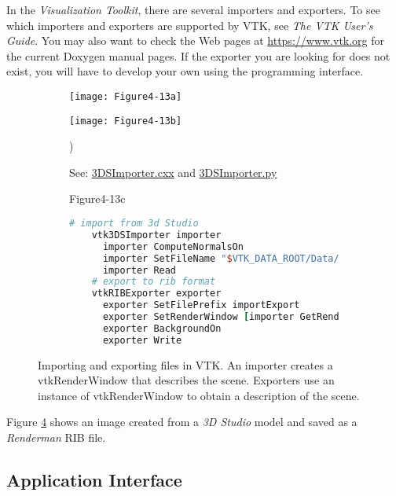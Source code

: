 In the \emph{Visualization Toolkit}, there are several importers and exporters. To see which importers and exporters are supported by VTK, see \emph{The VTK User's Guide}. You may also want to check the Web pages at \href{https://www.vtk.org}{https://www.vtk.org} for the current Doxygen manual pages. If the exporter you are looking for does not exist, you will have to develop your own using the programming interface.

\begin{figure}[htb]
  \begin{subfigure}[h]{0.48\linewidth}
    \texttt{[image: Figure4-13a]}
    \caption*{}
    \label{fig:Figure4-13a}
  \end{subfigure}
  \hfill
  \begin{subfigure}[h]{0.48\linewidth}
    \texttt{[image: Figure4-13b]}
    \caption*{See:  \href{https://lorensen.github.io/VTKExamples/site/Cxx/IO/3DSImporter/}{3DSImporter.cxx} and \href{https://lorensen.github.io/VTKExamples/site/Python/IO/3DSImporter/}{3DSImporter.py}})
    \label{fig:Figure4-13b}
  \end{subfigure}
  \hfill
  \begin{subfigure}[h]{0.96\linewidth}{Figure4-13c}
  \begin{lstlisting}[language=TCL,  caption={}, numbers=none, frame=none]
    # import from 3d Studio
    vtk3DSImporter importer
      importer ComputeNormalsOn
      importer SetFileName "$VTK_DATA_ROOT/Data/iflamigm.3ds"
      importer Read
    # export to rib format
    vtkRIBExporter exporter
      exporter SetFilePrefix importExport
      exporter SetRenderWindow [importer GetRenderWindow]
      exporter BackgroundOn
      exporter Write
    \end{lstlisting} 
    \caption*{}
    \label{fig:Figure4-13c}
  \end{subfigure}
  \caption{Importing and exporting files in VTK. An importer creates a vtkRenderWindow that describes the scene. Exporters use an instance of vtkRenderWindow to obtain a description of the scene.}\label{fig:Figure4-13}
\end{figure}

Figure \ref{fig:Figure4-13} shows an image created from a \emph{3D Studio} model and saved as a \emph{Renderman} RIB file.

\subsection{Application Interface}
\label{subsec:application_interface}

